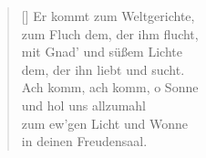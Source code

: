 \documentclass[fontsize=11pt]{scrartcl}
\begin{document}
\begin{multicols}{2}
\begin{verse}[\versewidth]
   Er kommt zum Weltgerichte,\\
  zum Fluch dem, der ihm flucht,\\
  mit Gnad' und süßem Lichte\\
  dem, der ihn liebt und sucht.\\
  Ach komm, ach komm, o Sonne\\%
  und hol uns allzumahl\\
  zum ew'gen Licht und Wonne\\
  in deinen Freudensaal.

\end{verse}
\end{multicols}
\end{document}
